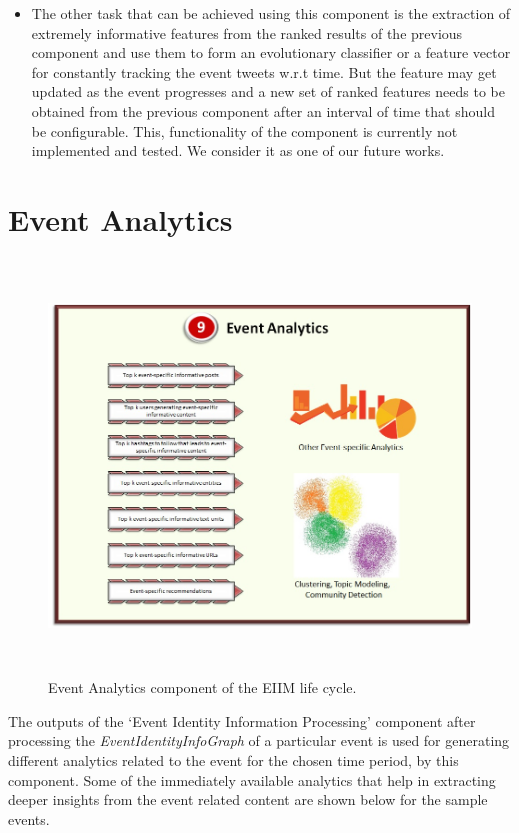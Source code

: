 \begin{itemize}
\item The other task that can be achieved using this component is the extraction of extremely informative features from the ranked results of the previous component and use them to form an evolutionary classifier or a feature vector for constantly tracking the event tweets w.r.t time. But the feature may get updated as the event progresses and a new set of ranked features needs to be obtained from the previous component after an interval of time that should be configurable. This, functionality of the component is currently not implemented and tested. We consider it as one of our future works.
\end{itemize}


\section{Event Analytics}
\begin{figure}[htbp]
  \caption{Event Analytics component of the EIIM life cycle.}
  \centering
    \includegraphics[width=14cm,height=11cm]{Figures/EIIMComponents/EventAnalytics.jpg}
\end{figure}

The outputs of the `Event Identity Information Processing' component after processing the \textit{EventIdentityInfoGraph} of a particular event is used for generating different analytics related to the event for the chosen time period, by this component. Some of the immediately available analytics that help in extracting deeper insights from the event related content are shown below for the sample events.

